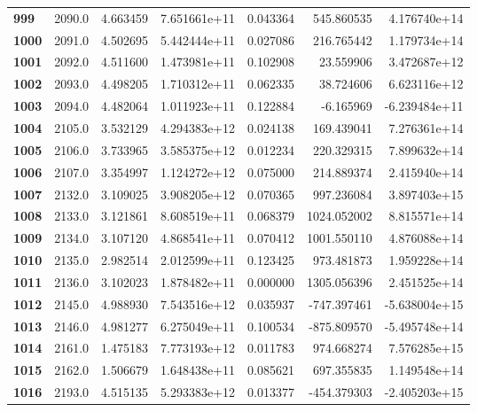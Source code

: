 \documentclass{report}[12pt]
\begin{document}
\begin{center}
\begin{tabular}{lrrrrrr}
\textbf{999 } &         2090.0 &   4.663459 &  7.651661e+11 &    0.043364 &   545.860535 &  4.176740e+14 \\
\textbf{1000} &         2091.0 &   4.502695 &  5.442444e+11 &    0.027086 &   216.765442 &  1.179734e+14 \\
\textbf{1001} &         2092.0 &   4.511600 &  1.473981e+11 &    0.102908 &    23.559906 &  3.472687e+12 \\
\textbf{1002} &         2093.0 &   4.498205 &  1.710312e+11 &    0.062335 &    38.724606 &  6.623116e+12 \\
\textbf{1003} &         2094.0 &   4.482064 &  1.011923e+11 &    0.122884 &    -6.165969 & -6.239484e+11 \\
\textbf{1004} &         2105.0 &   3.532129 &  4.294383e+12 &    0.024138 &   169.439041 &  7.276361e+14 \\
\textbf{1005} &         2106.0 &   3.733965 &  3.585375e+12 &    0.012234 &   220.329315 &  7.899632e+14 \\
\textbf{1006} &         2107.0 &   3.354997 &  1.124272e+12 &    0.075000 &   214.889374 &  2.415940e+14 \\
\textbf{1007} &         2132.0 &   3.109025 &  3.908205e+12 &    0.070365 &   997.236084 &  3.897403e+15 \\
\textbf{1008} &         2133.0 &   3.121861 &  8.608519e+11 &    0.068379 &  1024.052002 &  8.815571e+14 \\
\textbf{1009} &         2134.0 &   3.107120 &  4.868541e+11 &    0.070412 &  1001.550110 &  4.876088e+14 \\
\textbf{1010} &         2135.0 &   2.982514 &  2.012599e+11 &    0.123425 &   973.481873 &  1.959228e+14 \\
\textbf{1011} &         2136.0 &   3.102023 &  1.878482e+11 &    0.000000 &  1305.056396 &  2.451525e+14 \\
\textbf{1012} &         2145.0 &   4.988930 &  7.543516e+12 &    0.035937 &  -747.397461 & -5.638004e+15 \\
\textbf{1013} &         2146.0 &   4.981277 &  6.275049e+11 &    0.100534 &  -875.809570 & -5.495748e+14 \\
\textbf{1014} &         2161.0 &   1.475183 &  7.773193e+12 &    0.011783 &   974.668274 &  7.576285e+15 \\
\textbf{1015} &         2162.0 &   1.506679 &  1.648438e+11 &    0.085621 &   697.355835 &  1.149548e+14 \\
\textbf{1016} &         2193.0 &   4.515135 &  5.293383e+12 &    0.013377 &  -454.379303 & -2.405203e+15 \\

\end{tabular}
\end{center}
\end{document}
